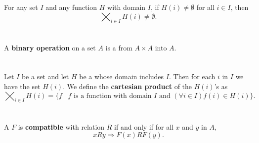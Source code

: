 \documentclass{report}
\begin{document}
For any set $I$ and any function $H$ with domain $I$, if $H(i) \neq \emptyset$
  for all $i \in I$, then $$\bigtimes_{i \in I} H(i) \neq \emptyset.$$

\begin{axiom}


\end{axiom}

\section{}%

A \textbf{binary operation} on a set $A$ is a  from
  $A \times A$ into $A$.

\section{}%

Let $I$ be a set and let $H$ be a  whose domain includes $I$.
Then for each $i$ in $I$ we have the set $H(i)$.
We define the \textbf{cartesian product} of the $H(i)$'s as
  $$\bigtimes_{i \in I} H(i) = \{f \mid
    f \text{ is a function with domain } I \text{ and }
      (\forall i \in I) f(i) \in H(i)\}.$$

\begin{definition}


\end{definition}

\section{}%

A  $F$ is \textbf{compatible} with relation $R$ if and
  only if for all $x$ and $y$ in $A$,
  $$xRy \Rightarrow F(x)RF(y).$$

\begin{definition}


\end{definition}

\section{}%
\end{document}

